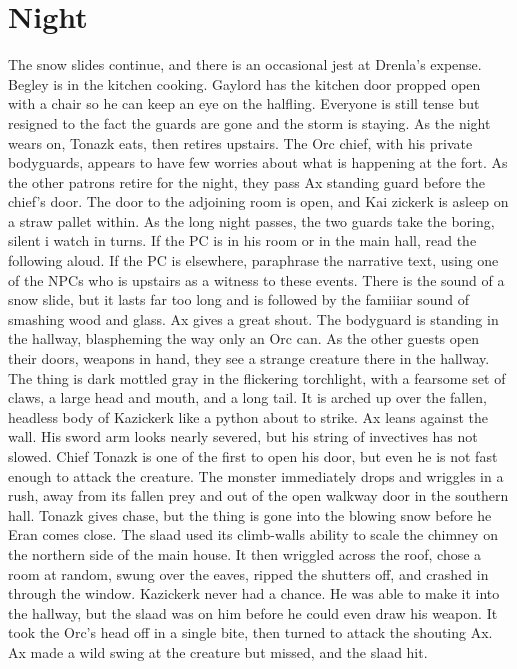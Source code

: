 \documentclass[a5paper,11pt,twoside]{book}
\begin{document}
{{{{{\section*{Night} The snow slides continue, and there is an occasional jest at Drenla’s expense.
Begley is in the kitchen cooking.
Gaylord has the kitchen door propped open with a chair so he can keep an eye on the halfling.
Everyone is still tense but resigned to the fact the guards are gone and the storm is staying.
As the night wears on, Tonazk eats, then retires upstairs.
The Orc chief, with his private bodyguards, appears to have few worries about what is happening at the fort.
As the other patrons retire for the night, they pass Ax standing guard before the chief’s door.
The door to the adjoining room is open, and Kai zickerk is asleep on a straw pallet within.
As the long night passes, the two guards take the boring, silent i watch in turns.
If the PC is in his room or in the main hall, read the following aloud.
If the PC is elsewhere, paraphrase the narrative text, using one of the NPCs who is upstairs as a witness to these events.
There is the sound of a snow slide, but it lasts far too long and is followed by the famiiiar sound of smashing wood and glass.
Ax gives a great shout.
The bodyguard is standing in the hallway, blaspheming the way only an Orc can.
As the other guests open their doors, weapons in hand, they see a strange creature there in the hallway.
The thing is dark mottled gray in the flickering torchlight, with a fearsome set of claws, a large head and mouth, and a long tail.
It is arched up over the fallen, headless body of Kazickerk like a python about to strike.
Ax leans against the wall.
His sword arm looks nearly severed, but his string of invectives has not slowed.
 Chief Tonazk is one of the first to open his door, but even he is not fast enough to attack the creature.
The monster immediately drops and wriggles in a rush, away from its fallen prey and out of the open walkway door in the southern hall.
Tonazk gives chase, but the thing is gone into the blowing snow before he Eran comes close.
 The slaad used its climb-walls ability to scale the chimney on the northern side of the main house.
It then wriggled across the roof, chose a room at random, swung over the eaves, ripped the shutters off, and crashed in through the window.
Kazickerk never had a chance.
He was able to make it into the hallway, but the slaad was on him before he could even draw his weapon.
It took the Orc’s head off in a single bite, then turned to attack the shouting Ax.
Ax made a wild swing at the creature but missed, and the slaad hit.
}}}}}
\end{document}
